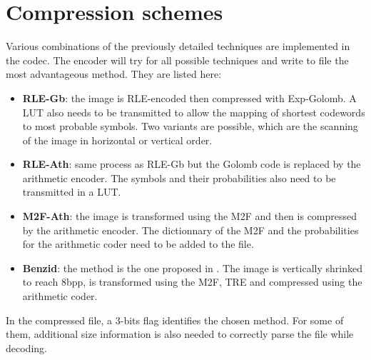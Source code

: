 \section{Compression schemes}

Various combinations of the previously detailed techniques are implemented in the codec. The encoder will try for all possible techniques and write to file the most advantageous method. They are listed here:

\begin{itemize}
	\item \textbf{RLE-Gb}: the image is RLE-encoded then compressed with Exp-Golomb. A LUT also needs to be transmitted to allow the mapping of shortest codewords to most probable symbols. Two variants are possible, which are the scanning of the image in horizontal or vertical order. 
	
	\item \textbf{RLE-Ath}: same process as RLE-Gb but the Golomb code is replaced by the arithmetic encoder. The symbols and their probabilities also need to be transmitted in a LUT.
	
	\item \textbf{M2F-Ath}: the image is transformed using the M2F and then is compressed by the arithmetic encoder. The dictionnary of the M2F and the probabilities for the arithmetic coder need to be added to the file.
	
	\item \textbf{Benzid}: the method is the one proposed in \cite{benzid}. The image is vertically shrinked to reach 8bpp, is transformed using the M2F, TRE and compressed using the arithmetic coder.
\end{itemize}

In the compressed file, a 3-bits flag identifies the chosen method. For some of them, additional size information is also needed to correctly parse the file while decoding.